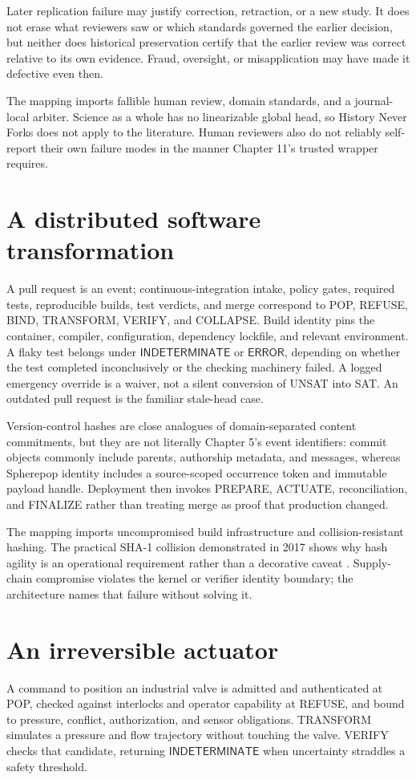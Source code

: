 \documentclass[11pt,openany]{book}
\newcommand{\Indeterminate}{\mathsf{INDETERMINATE}}
\newcommand{\ErrorVerdict}{\mathsf{ERROR}}
\begin{document}
Later replication failure may justify correction, retraction, or a new study.
It does not erase what reviewers saw or which standards governed the earlier
decision, but neither does historical preservation certify that the earlier
review was correct relative to its own evidence. Fraud, oversight, or
misapplication may have made it defective even then.

The mapping imports fallible human review, domain standards, and a journal-local
arbiter. Science as a whole has no linearizable global head, so History Never
Forks does not apply to the literature. Human reviewers also do not reliably
self-report their own failure modes in the manner Chapter 11's trusted wrapper
requires.

\section{A distributed software transformation}
A pull request is an event; continuous-integration intake, policy gates,
required tests, reproducible builds, test verdicts, and merge correspond to
POP, REFUSE, BIND, TRANSFORM, VERIFY, and COLLAPSE. Build identity pins the
container, compiler, configuration, dependency lockfile, and relevant
environment. A flaky test belongs under \(\Indeterminate\) or
\(\ErrorVerdict\), depending on whether the test completed inconclusively or
the checking machinery failed. A logged emergency override is a waiver, not a
silent conversion of UNSAT into SAT. An outdated pull request is the familiar
stale-head case.

Version-control hashes are close analogues of domain-separated content
commitments, but they are not literally Chapter 5's event identifiers: commit
objects commonly include parents, authorship metadata, and messages, whereas
Spherepop identity includes a source-scoped occurrence token and immutable
payload handle. Deployment then invokes PREPARE, ACTUATE, reconciliation, and
FINALIZE rather than treating merge as proof that production changed.

The mapping imports uncompromised build infrastructure and collision-resistant
hashing. The practical SHA-1 collision demonstrated in 2017 shows why hash
agility is an operational requirement rather than a decorative caveat
\cite{stevens-sha1}. Supply-chain compromise violates the kernel or verifier identity
boundary; the architecture names that failure without solving it.

\section{An irreversible actuator}
A command to position an industrial valve is admitted and authenticated at
POP, checked against interlocks and operator capability at REFUSE, and bound to
pressure, conflict, authorization, and sensor obligations. TRANSFORM simulates
a pressure and flow trajectory without touching the valve. VERIFY checks that
candidate, returning \(\Indeterminate\) when uncertainty straddles a safety
threshold.
\end{document}

